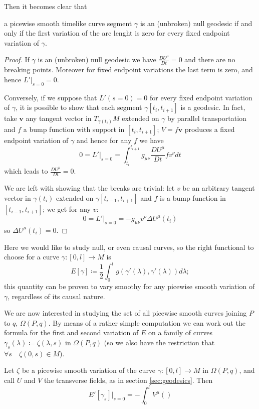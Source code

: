 Then it becomes clear that 
\begin{corollary}
	a picewise smooth timelike curve segment \(\gamma\) is an (unbroken) null geodesic if and only if the first variation of the arc lenght is zero for every fixed endpoint variation of \(\gamma\).
\end{corollary}
\begin{proof}
	If \(\gamma\) is an (unbroken) null geodesic we have \(\frac{D U^{\mu}}{D t} = 0\) and there are no breaking points. Moreover for fixed endpoint variations the last term is zero, and hence \(L'\vert_{s = 0} = 0\).
	
	Conversely, if we suppose that \(L'(s =0) = 0\) for every fixed endpoint variation of \(\gamma\), it is possible to show that each segment \(\gamma[t_i, t_{i + 1}]\) is a geodesic.
	In fact, take \(\textbf{v}\) any tangent vector in \(T_{\gamma(t_i)}M\)  extended on \(\gamma\) by parallel transportation and \(f\) a bump function with support in \([t_i, t_{i + 1}]\); \(V = f\textbf{v}\) produces a fixed endpoint variation of \(\gamma\) and hence for any \(f\) we have 
	\[
	0 = L'\vert_{s = 0} = \int_{t_i}^{t_{i+1}} g_{\mu\nu}\frac{DU^{\mu}}{Dt} f v^{\nu} dt
	\]
	which leads to \(\frac{DU^{\mu}}{Dt} = 0\).
	
	We are left with showing that the breaks are trivial: let \(v\) be an arbitrary tangent vector in \(\gamma(t_i)\) extended on \(\gamma[t_{i - 1}, t_{i + 1}]\) and \(f\) is a bump function in \([t_{i - 1}, t_{i + 1}]\); we get for any \(v\):
	\[
	0 = L'\vert_{s = 0} = -g_{\mu\nu}v^{\nu}\Delta U^{\mu}(t_i)
	\]
	so \(\Delta U^{\mu}(t_i) = 0\).
\end{proof}
Here we would like to study null, or even causal curves, so the right functional to choose for a curve \(\gamma : [0, l] \rightarrow M\) is 
\[
E[\gamma] \coloneqq \frac{1}{2}\int_{0}^{l} g(\gamma'(\lambda), \gamma'(\lambda))d\lambda;
\]
this quantity can be proven to vary smoothy for any picewise smooth variation of \(\gamma\), regardless of its causal nature.

We are now interested in studying the set of all picewise smooth curves joining \(P\) to \(q\), \(\Omega(P, q)\). By means of a rather simple computation we can work out the formula for the first and second variation of \(E\) on a family of curves \(\gamma_s(\lambda) \coloneqq
\zeta(\lambda, s)\) in \(\Omega(P, q)\) (so we also have the restriction that \(\forall s \quad \zeta(0, s) \in M\)).

\begin{lemma}
	Let \(\zeta\) be a picewise smooth variation of the curve \(\gamma: [0, l] \rightarrow M\)  in \(\Omega(P, q)\), and call \(U\) and \(V\) the transverse fields, as in section \ref{sec:geodesics}. Then
	\[
	E'[\gamma_s]\vert_{s = 0} = - \int_{0}^{l} V^{\mu}()
	\]
	
\end{lemma}